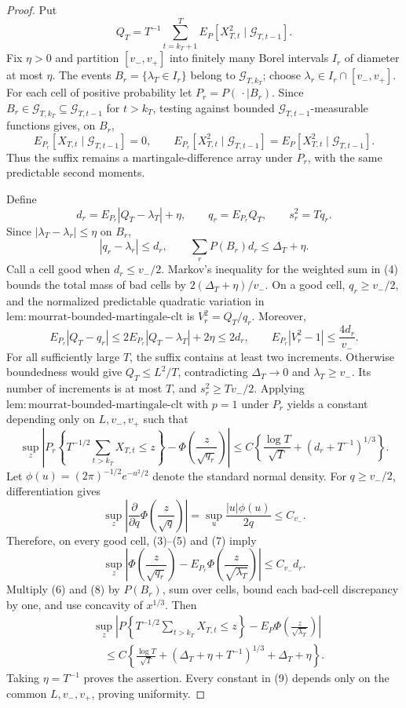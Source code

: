 \documentclass{article}
\begin{document}
\begin{proof}
Put
\[
 Q_T=T^{-1}\sum_{t=k_T+1}^T
 E_P[X_{T,t}^2\mid\mathcal G_{T,t-1}].
\tag{1}
\]
Fix \(\eta>0\) and partition \([v_-,v_+]\) into finitely many Borel intervals \(I_r\) of diameter at most \(\eta\). The events \(B_r=\{\lambda_T\in I_r\}\) belong to \(\mathcal G_{T,k_T}\); choose \(\lambda_r\in I_r\cap[v_-,v_+]\). For each cell of positive probability let \(P_r=P(\,\cdot\mid B_r)\). Since \(B_r\in\mathcal G_{T,k_T}\subseteq\mathcal G_{T,t-1}\) for \(t>k_T\), testing against bounded \(\mathcal G_{T,t-1}\)-measurable functions gives, on \(B_r\),
\[
 E_{P_r}[X_{T,t}\mid\mathcal G_{T,t-1}]=0,
 \qquad
 E_{P_r}[X_{T,t}^2\mid\mathcal G_{T,t-1}]
 =E_P[X_{T,t}^2\mid\mathcal G_{T,t-1}].
\tag{2}
\]
Thus the suffix remains a martingale-difference array under \(P_r\), with the same predictable second moments.

Define
\[
 d_r=E_{P_r}|Q_T-\lambda_T|+\eta,\qquad
 q_r=E_{P_r}Q_T,\qquad s_r^2=Tq_r.
\tag{3}
\]
Since \(|\lambda_T-\lambda_r|\le\eta\) on \(B_r\),
\[
 |q_r-\lambda_r|\le d_r,\qquad
 \sum_rP(B_r)d_r\le\Delta_T+\eta.
\tag{4}
\]
Call a cell good when \(d_r\le v_-/2\). Markov's inequality for the weighted sum in (4) bounds the total mass of bad cells by \(2(\Delta_T+\eta)/v_-\). On a good cell, \(q_r\ge v_-/2\), and the normalized predictable quadratic variation in \(\mathrm{lem:mourrat\text{-}bounded\text{-}martingale\text{-}clt}\) is \(V_r^2=Q_T/q_r\). Moreover,
\[
 E_{P_r}|Q_T-q_r|
 \le2E_{P_r}|Q_T-\lambda_T|+2\eta\le2d_r,
 \qquad E_{P_r}|V_r^2-1|\le\frac{4d_r}{v_-}.
\tag{5}
\]
For all sufficiently large \(T\), the suffix contains at least two increments. Otherwise boundedness would give \(Q_T\le L^2/T\), contradicting \(\Delta_T\to0\) and \(\lambda_T\ge v_-\). Its number of increments is at most \(T\), and \(s_r^2\ge Tv_-/2\). Applying \(\mathrm{lem:mourrat\text{-}bounded\text{-}martingale\text{-}clt}\) with \(p=1\) under \(P_r\) yields a constant depending only on \(L,v_-,v_+\) such that
\[
 \sup_z\left|P_r\!\left\{T^{-1/2}\sum_{t>k_T}X_{T,t}\le z\right\}
 -\Phi\!\left(\frac z{\sqrt{q_r}}\right)\right|
 \le C\left\{\frac{\log T}{\sqrt T}+(d_r+T^{-1})^{1/3}\right\}.
\tag{6}
\]
Let \(\phi(u)=(2\pi)^{-1/2}e^{-u^2/2}\) denote the standard normal density. For \(q\ge v_-/2\), differentiation gives
\[
 \sup_z\left|\frac{\partial}{\partial q}
 \Phi\!\left(\frac z{\sqrt q}\right)\right|
 =\sup_u\frac{|u|\phi(u)}{2q}\le C_{v_-}.
\tag{7}
\]
Therefore, on every good cell, (3)--(5) and (7) imply
\[
 \sup_z\left|\Phi\!\left(\frac z{\sqrt{q_r}}\right)
 -E_{P_r}\Phi\!\left(\frac z{\sqrt{\lambda_T}}\right)\right|
 \le C_{v_-}d_r.
\tag{8}
\]
Multiply (6) and (8) by \(P(B_r)\), sum over cells, bound each bad-cell discrepancy by one, and use concavity of \(x^{1/3}\). Then
\[
\begin{aligned}
 &\sup_z\left|P\!\left\{T^{-1/2}\sum_{t>k_T}X_{T,t}\le z\right\}
 -E_P\Phi\!\left(\frac z{\sqrt{\lambda_T}}\right)\right|\\
 &\quad\le C\left\{\frac{\log T}{\sqrt T}
 +(\Delta_T+\eta+T^{-1})^{1/3}+\Delta_T+\eta\right\}.
\end{aligned}
\tag{9}
\]
Taking \(\eta=T^{-1}\) proves the assertion. Every constant in (9) depends only on the common \(L,v_-,v_+\), proving uniformity.
\end{proof}
\end{document}
